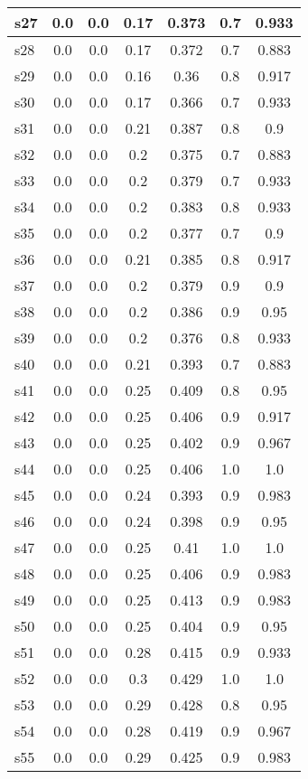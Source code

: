\documentclass{article}
\begin{document}
\begin{tabular}{|l|c|c|c|c|c|c|}
\hline
s27 &0.0 & 0.0 & 0.17 & 0.373 & 0.7 & 0.933\\
\hline
s28 &0.0 & 0.0 & 0.17 & 0.372 & 0.7 & 0.883\\
\hline
s29 &0.0 & 0.0 & 0.16 & 0.36 & 0.8 & 0.917\\
\hline
s30 &0.0 & 0.0 & 0.17 & 0.366 & 0.7 & 0.933\\
\hline
s31 &0.0 & 0.0 & 0.21 & 0.387 & 0.8 & 0.9\\
\hline
s32 &0.0 & 0.0 & 0.2 & 0.375 & 0.7 & 0.883\\
\hline
s33 &0.0 & 0.0 & 0.2 & 0.379 & 0.7 & 0.933\\
\hline
s34 &0.0 & 0.0 & 0.2 & 0.383 & 0.8 & 0.933\\
\hline
s35 &0.0 & 0.0 & 0.2 & 0.377 & 0.7 & 0.9\\
\hline
s36 &0.0 & 0.0 & 0.21 & 0.385 & 0.8 & 0.917\\
\hline
s37 &0.0 & 0.0 & 0.2 & 0.379 & 0.9 & 0.9\\
\hline
s38 &0.0 & 0.0 & 0.2 & 0.386 & 0.9 & 0.95\\
\hline
s39 &0.0 & 0.0 & 0.2 & 0.376 & 0.8 & 0.933\\
\hline
s40 &0.0 & 0.0 & 0.21 & 0.393 & 0.7 & 0.883\\
\hline
s41 &0.0 & 0.0 & 0.25 & 0.409 & 0.8 & 0.95\\
\hline
s42 &0.0 & 0.0 & 0.25 & 0.406 & 0.9 & 0.917\\
\hline
s43 &0.0 & 0.0 & 0.25 & 0.402 & 0.9 & 0.967\\
\hline
s44 &0.0 & 0.0 & 0.25 & 0.406 & 1.0 & 1.0\\
\hline
s45 &0.0 & 0.0 & 0.24 & 0.393 & 0.9 & 0.983\\
\hline
s46 &0.0 & 0.0 & 0.24 & 0.398 & 0.9 & 0.95\\
\hline
s47 &0.0 & 0.0 & 0.25 & 0.41 & 1.0 & 1.0\\
\hline
s48 &0.0 & 0.0 & 0.25 & 0.406 & 0.9 & 0.983\\
\hline
s49 &0.0 & 0.0 & 0.25 & 0.413 & 0.9 & 0.983\\
\hline
s50 &0.0 & 0.0 & 0.25 & 0.404 & 0.9 & 0.95\\
\hline
s51 &0.0 & 0.0 & 0.28 & 0.415 & 0.9 & 0.933\\
\hline
s52 &0.0 & 0.0 & 0.3 & 0.429 & 1.0 & 1.0\\
\hline
s53 &0.0 & 0.0 & 0.29 & 0.428 & 0.8 & 0.95\\
\hline
s54 &0.0 & 0.0 & 0.28 & 0.419 & 0.9 & 0.967\\
\hline
s55 &0.0 & 0.0 & 0.29 & 0.425 & 0.9 & 0.983\\

\end{tabular}
\end{document}
